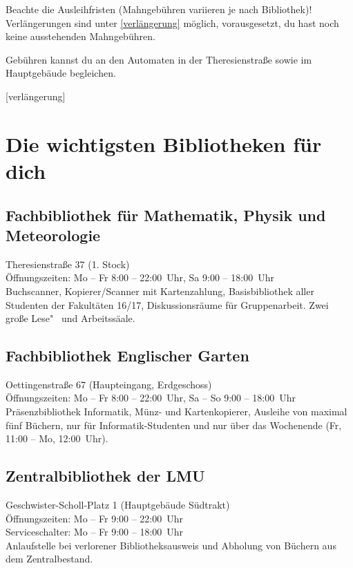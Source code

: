 Beachte die Ausleihfristen (Mahngebühren variieren je nach Bibliothek)! 
Verlängerungen sind unter \ref{verlängerung}
möglich, vorausgesetzt, du hast noch keine ausstehenden Mahngebühren.

Gebühren kannst du an den Automaten in der Theresienstraße sowie
im Hauptgebäude begleichen.

\begin{urlList}
	[verlängerung]
\end{urlList}

\section{Die wichtigsten Bibliotheken für dich}

\subsection*{Fachbibliothek für Mathematik, Physik und Meteorologie\subjectList{\subjectM\subjectW\subjectP}}
Theresienstraße 37 (1. Stock)\\
Öffnungszeiten: Mo -- Fr 8:00 -- 22:00~Uhr, Sa 9:00 -- 18:00~Uhr\\
Buchscanner, Kopierer/Scanner mit Kartenzahlung, Basisbibliothek aller
Studenten der Fakultäten 16/17, Diskussionsräume für Gruppenarbeit.
Zwei große Lese"~ und Arbeitssäale.

\subsection*{Fachbibliothek Englischer Garten\subjectList{\subjectI\subjectMI}}
Oettingenstraße 67 (Haupteingang, Erdgeschoss)\\
Öffnungszeiten: Mo -- Fr 8:00 -- 22:00~Uhr, Sa -- So 9:00 -- 18:00~Uhr\\
Präsenzbibliothek Informatik, Münz- und Kartenkopierer, Ausleihe von maximal fünf Büchern, nur für Informatik-Studenten und nur über das Wochenende (Fr, 11:00 -- Mo, 12:00~Uhr).

\subsection*{Zentralbibliothek der LMU}
Geschwister-Scholl-Platz 1 (Hauptgebäude Südtrakt)\\
Öffnungszeiten: Mo -- Fr 9:00 -- 22:00~Uhr\\
Serviceschalter: Mo -- Fr 9:00 -- 18:00~Uhr\\
Anlaufstelle bei verlorener Bibliotheksausweis und Abholung von Büchern aus dem Zentralbestand.

